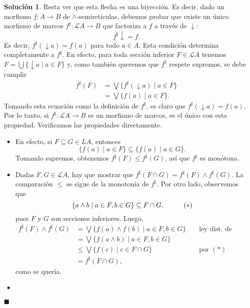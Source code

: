 \documentclass[12pt,letterpaper,titlepage]{article}
\newcommand{\xqed}[1]{%
  \leavevmode\unskip\penalty9999 \hbox{}\nobreak\hfill
  \quad\hbox{\ensuremath{#1}}}
\theoremstyle{definition}
\newtheorem*{soltemp}{Solución}
\newenvironment{sol}[1]{%
    \begin{soltemp}#1}{%
    \xqed{\blacksquare}\end{soltemp}%
}
\newcommand\Sup{\bigvee}
\newcommand\down{{\downarrow}}
\renewcommand\inf{\wedge}
\renewcommand\cal[1]{\mathcal{#1}}
\newcommand\<{\langle}
\renewcommand\>{\rangle}
\begin{document}
\begin{sol}
    Resta ver que esta flecha es una biyección.
    Es decir, dado un morfismo $f:A\to B$
    de $\inf$-semiretículas,
    debemos probar que existe un único morfismo de marcos
    $f^\sharp:\cal LA\to B$ que factoriza a $f$ a través
    de $\down$:
    \[
        f^\sharp\down = f
    .\]
    Es decir, $f^\sharp(\down a)=f(a)$ para todo $a\in A$.
    Esta condición determina completamente a $f^\sharp$.
    En efecto, para toda sección inferior $F\in\cal LA$ tenemos
    $F=\bigcup\{\down a \mid a\in F\}$ y, como también queremos
    que $f^\sharp$ respete supremos, se debe cumplir
    \begin{align*}
        f^\sharp(F)
        &= \Sup\{f^\sharp(\down a) \mid a\in F\} \\
        &= \Sup\{f(a) \mid a\in F\}.
    \end{align*}
    Tomando esta ecuación como la definición de $f^\sharp$, es
    claro que $f^\sharp(\down a)=f(a)$.
    Por lo tanto, si $f^\sharp:\cal LA\to B$ es un
    morfismo de marcos, es el único con esta propiedad.
    Verificamos las propiedades directamente.
    \begin{itemize}
        \item En efecto, si $F\subseteq G\cal\in LA$, entonces 
        \[
            \{f(a) \mid a\in F\} \subseteq \{f(a) \mid a\in G\}
        .\]
        Tomando supremos, obtenemos
        $f^\sharp(F)\leq f^\sharp(G)$, así que $f^\sharp$ es
        monótona.
        \item
        Dadas $F,G\in\cal LA$, hay que mostrar
        que $f^\sharp(F\cap G)=f^\sharp(F)\inf f^\sharp(G)$.
        La comparación $\leq$ se sigue de la monotonía de
        $f^\sharp$.
        Por otro lado, observemos que
        \[
            \{ a\inf b \mid a\in F, b\in G\}
            \subseteq F\cap G,
            \hspace{10mm} (*)
        \]
        pues $F$ y $G$ son secciones inferiores.
        Luego,
        \begin{align*}
            f^\sharp(F)\inf f^\sharp(G)
            &= \Sup\{f(a)\inf f(b) \mid a\in F, b\in G\}
                && \text{ ley dist. de marcos } \\
            &= \Sup\{f(a\inf b) \mid a\in F, b\in G\} \\
            &\leq \Sup\{f(c) \mid c\in F\cap G\}
                && \text{ por $(*)$ } \\
            &= f^\sharp(F\cap G),
        \end{align*}
        como se quería.
        \item

\end{itemize}
\end{sol}
\end{document}
